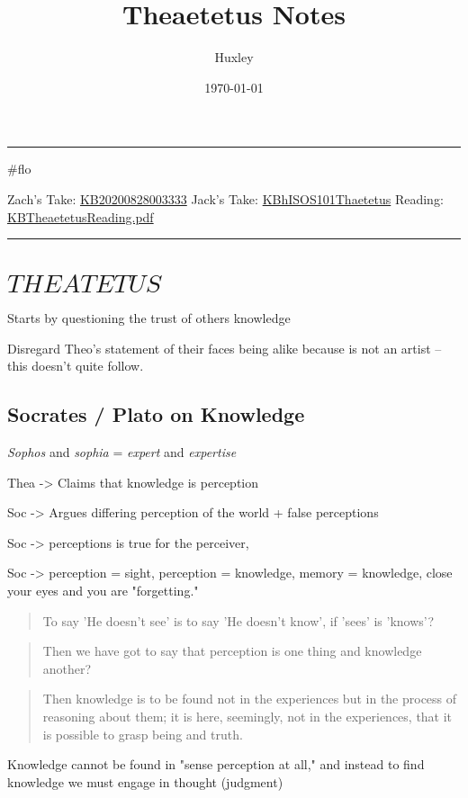 \documentclass[letterpaper]{article}
\author{Huxley}
\date{\today}
\title{Theaetetus Notes}
\renewcommand{\tableofcontents}{}
\begin{document}
\tableofcontents

\noindent\rule{\textwidth}{0.5pt}

\#flo

Zach's Take: \href{KB20200828003333.org}{KB20200828003333} Jack's
Take: \href{KBhISOS101Thaetetus.org}{KBhISOS101Thaetetus} Reading:
\href{KBTheaetetusReading.pdf.org}{KBTheaetetusReading.pdf}

\noindent\rule{\textwidth}{0.5pt}

\section{\(THEATETUS\)}
\label{sec:org29dfabf}
Starts by questioning the trust of others knowledge

Disregard Theo's statement of their faces being alike because is not an
artist -- this doesn't quite follow.

\subsection{Socrates / Plato on Knowledge}
\label{sec:org59bf3b4}
\emph{Sophos} and \emph{sophia} = \emph{expert} and \emph{expertise}

Thea -> Claims that knowledge is perception

Soc -> Argues differing perception of the world + false perceptions

Soc -> perceptions is true for the perceiver,

Soc -> perception = sight, perception = knowledge, memory = knowledge,
close your eyes and you are "forgetting."

\begin{quote}
To say 'He doesn't see' is to say 'He doesn't know', if 'sees' is
'knows'?
\end{quote}

\begin{quote}
Then we have got to say that perception is one thing and knowledge
another?
\end{quote}

\begin{quote}
Then knowledge is to be found not in the experiences but in the
process of reasoning about them; it is here, seemingly, not in the
experiences, that it is possible to grasp being and truth.
\end{quote}

Knowledge cannot be found in "sense perception at all," and instead to
find knowledge we must engage in thought (judgment)
\end{document}
